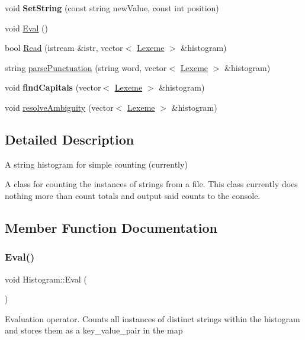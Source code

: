 \begin{DoxyCompactItemize}
void {\bfseries Set\+String} (const string new\+Value, const int position)
\item 
void \hyperlink{classHistogram_af4fdfc3e8e4c4028deaf9b663ee5832c}{Eval} ()
\item 
bool \hyperlink{classHistogram_afbdf1d9a97070fd3724dbe55fd9f8570}{Read} (istream \&istr, vector$<$ \hyperlink{classLexeme}{Lexeme} $>$ \&histogram)
\item 
string \hyperlink{classHistogram_aa1ae3a4f490aef85530afc028867b8f4}{parse\+Punctuation} (string word, vector$<$ \hyperlink{classLexeme}{Lexeme} $>$ \&histogram)
\item 
\mbox{\label{classHistogram_a97384bc67a4fcbd79f405329de0a4b41}} 
void {\bfseries find\+Capitals} (vector$<$ \hyperlink{classLexeme}{Lexeme} $>$ \&histogram)
\item 
void \hyperlink{classHistogram_a5adb0e9b69168b662af9f84cbf29d5a0}{resolve\+Ambiguity} (vector$<$ \hyperlink{classLexeme}{Lexeme} $>$ \&histogram)
\end{DoxyCompactItemize}


\subsection{Detailed Description}
A string histogram for simple counting (currently) 

A class for counting the instances of strings from a file. This class currently does nothing more than count totals and output said counts to the console. 

\subsection{Member Function Documentation}
\mbox{\label{classHistogram_af4fdfc3e8e4c4028deaf9b663ee5832c}} 
\subsubsection{\texorpdfstring{Eval()}{Eval()}}
{\footnotesize\ttfamily void Histogram\+::\+Eval (\begin{DoxyParamCaption}{ }\end{DoxyParamCaption})}

Evaluation operator. Counts all instances of distinct strings within the histogram and stores them as a key\+\_\+value\+\_\+pair in the map \mbox{\label{classHistogram_aff24f16064c037ca8929c4f9751aedbf}} 
